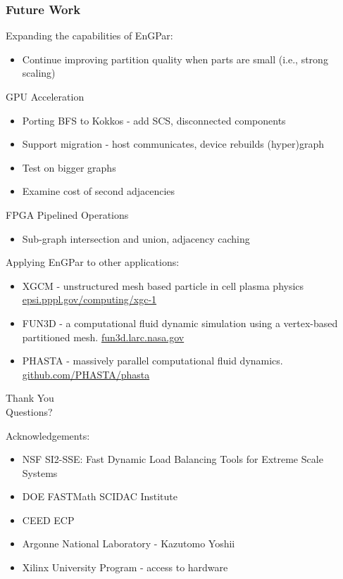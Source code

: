 \documentclass{beamer}
\begin{document}
\begin{frame}
  \frametitle{Future Work}
  Expanding the capabilities of EnGPar:
  \begin{itemize}
    \item Continue improving partition quality when parts are small (i.e., strong scaling)
  \end{itemize}
  GPU Acceleration
  \begin{itemize}
    \item Porting BFS to Kokkos - add SCS, disconnected components
    \item Support migration - host communicates, device rebuilds (hyper)graph
    \item Test on bigger graphs
    \item Examine cost of second adjacencies
  \end{itemize}
  FPGA Pipelined Operations
  \begin{itemize}
    \item Sub-graph intersection and union, adjacency caching 
  \end{itemize}
  Applying EnGPar to other applications:
  \begin{itemize}
    \item XGCM - unstructured mesh based particle in cell plasma physics \url{epsi.pppl.gov/computing/xgc-1}
    \item FUN3D - a computational fluid dynamic simulation using a vertex-based partitioned mesh. \url{fun3d.larc.nasa.gov}
    \item PHASTA - massively parallel computational fluid dynamics. \url{github.com/PHASTA/phasta}
  \end{itemize}
\end{frame}

\begin{frame}
  \begin{center}
    {\huge
      Thank You\\
      \bigskip
      \bigskip
      \bigskip
      \bigskip
      \bigskip
      \huge
      Questions?\\
      \bigskip
      \bigskip
      \bigskip
    }
  \end{center}
  \large
  Acknowledgements:\\
  \begin{itemize}
    \item NSF SI2-SSE: Fast Dynamic Load Balancing Tools for Extreme Scale Systems
    \item DOE FASTMath SCIDAC Institute
    \item CEED ECP
    \item Argonne National Laboratory - Kazutomo Yoshii
    \item Xilinx University Program - access to hardware
  \end{itemize}
\end{frame}
\end{document}
